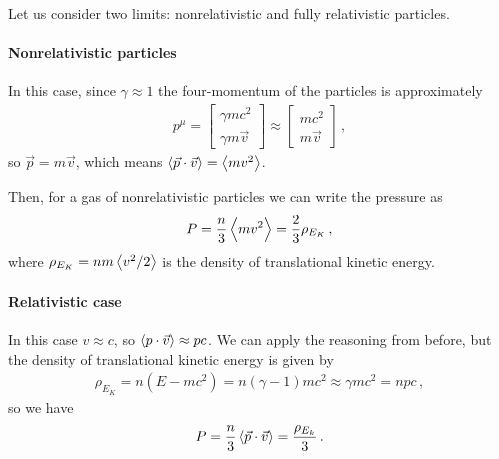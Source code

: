\documentclass[main.tex]{subfiles}
\begin{document}
Let us consider two limits: nonrelativistic and fully relativistic particles.

\paragraph{Nonrelativistic particles}

In this case, since \(\gamma \approx 1\) the four-momentum of the particles is approximately 
%
\begin{align}
p^{\mu } = \left[\begin{array}{c}
\gamma mc^2 \\ 
\gamma m \vec{v}
\end{array}\right]
\approx \left[\begin{array}{c}
mc^2 \\ 
m \vec{v}
\end{array}\right]
\,,
\end{align}
%
so \(\vec{p} = m \vec{v}\), which means \(\expval{\vec{p} \cdot \vec{v}}  = \expval{ m v^2}\). 


Then, for a gas of nonrelativistic particles we can write the pressure as 
%
\begin{align}
  P = \frac{n}{3} \expval{ m v^2} = \frac{2}{3} \rho_{E_K}
\,,
\end{align}
%
where \(\rho_{E_K} = n m \expval{ v^2 /2}\) is the density of translational kinetic energy.

\paragraph{Relativistic case}

In this case \(v \approx c\), so \(\expval{p \cdot \vec{v}} \approx pc\). We can apply the reasoning from before, but the density of translational kinetic energy is given by 
%
\begin{align}
\rho_{E_K} = n (E - mc^2) = n (\gamma -1) mc^2 \approx \gamma mc^2 = npc 
\,,
\end{align}
%
so we have 
%
\begin{align}
P = \frac{n}{3} \expval{\vec{p} \cdot \vec{v}} = \frac{\rho _{E_k}}{3}
\,.
\end{align}
\end{document}
